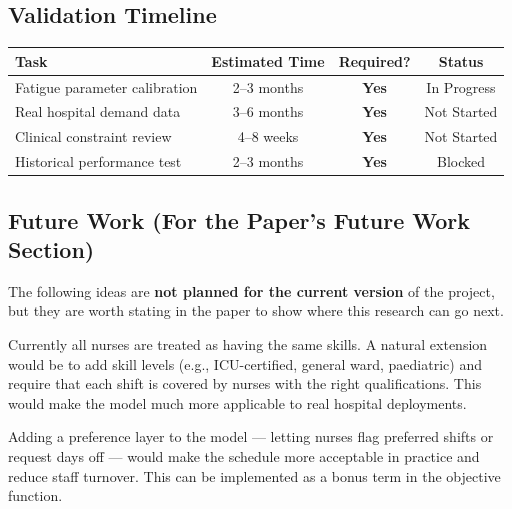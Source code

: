 \documentclass[12pt,a4paper]{article}
\begin{document}
\subsection{Validation Timeline}

\begin{center}
\begin{tabular}{lccc}
  \toprule
  \textbf{Task} & \textbf{Estimated Time} & \textbf{Required?} & \textbf{Status}\\
  \midrule
  Fatigue parameter calibration & 2–3 months & \textcolor{accentred}{\textbf{Yes}} & \colorbox{paleyellow}{\small In Progress}\\
  Real hospital demand data     & 3–6 months & \textcolor{accentred}{\textbf{Yes}} & \colorbox{palered}{\small Not Started}\\
  Clinical constraint review    & 4–8 weeks  & \textcolor{accentred}{\textbf{Yes}} & \colorbox{palered}{\small Not Started}\\
  Historical performance test   & 2–3 months & \textcolor{accentred}{\textbf{Yes}} & \colorbox{palered}{\small Blocked}\\
  \bottomrule
\end{tabular}
\end{center}

\subsection{Future Work (For the Paper's Future Work Section)}

The following ideas are \textbf{not planned for the current version} of the project, but they are worth stating in the paper to show where this research can go next.

\begin{solutionbox}
Currently all nurses are treated as having the same skills. A natural extension would be to add skill levels (e.g., ICU-certified, general ward, paediatric) and require that each shift is covered by nurses with the right qualifications. This would make the model much more applicable to real hospital deployments.
\end{solutionbox}

\vspace{6pt}
\begin{solutionbox}
Adding a preference layer to the model — letting nurses flag preferred shifts or request days off — would make the schedule more acceptable in practice and reduce staff turnover. This can be implemented as a bonus term in the objective function.
\end{solutionbox}
\end{document}
